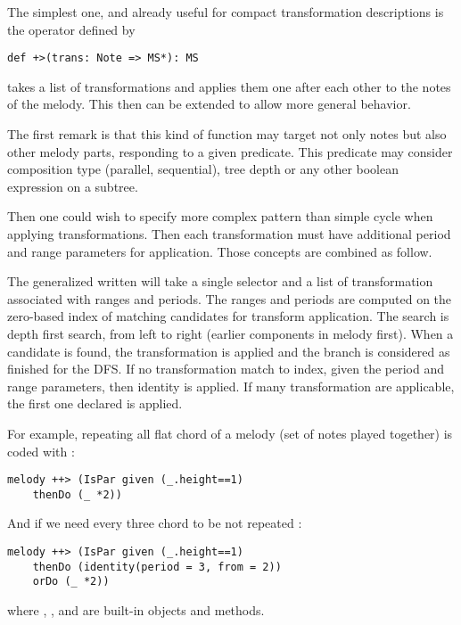 \documentclass[preprint]{sigplanconf}
\begin{document}
The simplest one, and already useful for compact transformation descriptions is the operator defined by
\begin{lstlisting}
def +>(trans: Note => MS*): MS
\end{lstlisting}
\lln{+>} takes a list of transformations and applies them one after each other to the notes of the melody. 
This then can be extended to allow more general behavior.

The first remark is that this kind of function may target not only notes but also other melody parts, responding to a given predicate. This predicate may consider composition type (parallel, sequential), tree depth or any other boolean expression on a subtree.

Then one could wish to specify more complex pattern than simple cycle when applying transformations. Then each transformation must have additional period and range parameters for application. Those concepts are combined as follow.

The generalized \lln{+>} written \lln{++>} will take a single selector and a list of transformation associated with ranges and periods. The ranges and periods are computed on the zero-based index of matching candidates for transform application.
The search is depth first search, from left to right (earlier components in melody first). When a candidate is found, the transformation is applied and the branch is considered as finished for the DFS. If no transformation match to index, given the period and range parameters, then identity is applied. If many transformation are applicable, the first one declared is applied.

For example, repeating all flat chord of a melody (set of notes played together) is coded with :
\begin{lstlisting}
melody ++> (IsPar given (_.height==1)
    thenDo (_ *2))
\end{lstlisting}
And if we need every three chord to be not repeated :
\begin{lstlisting}
melody ++> (IsPar given (_.height==1)
    thenDo (identity(period = 3, from = 2))
    orDo (_ *2))
\end{lstlisting}
where , ,  and  are built-in objects and methods.
\end{document}
